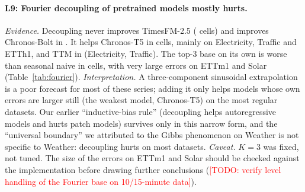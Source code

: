 \documentclass[11pt,a4paper]{article}
\newcommand{\lrn}[1]{\textbf{L#1}}
\newcommand{\todo}[1]{\textcolor{red}{[TODO: #1]}}
\begin{document}
\begin{table}[t]
\centering
\caption{Effect of Fourier decoupling (top-3 rFFT base + model on the remainder) on zero-shot models: relative MSE change in \%, averaged over horizons (negative is better).}
\label{tab:fourier}
\resizebox{\columnwidth}{!}{}
\end{table}

\paragraph{\lrn{9}: Fourier decoupling of pretrained models mostly hurts.}
\emph{Evidence.} Decoupling never improves TimesFM-2.5 (\fdecTimesFMTwoFiveImproved{} cells) and improves Chronos-Bolt in \fdecChronosBoltImproved{}. It helps Chronos-T5 in \fdecChronosTFiveImproved{} cells, mainly on Electricity, Traffic and ETTh1, and TTM in \fdecTTMImproved{} (Electricity, Traffic). The top-3 base on its own is worse than seasonal naive in \fourierBaseWorseThanSnaive{} cells, with very large errors on ETTm1 and Solar (Table~\ref{tab:fourier}).
\emph{Interpretation.} A three-component sinusoidal extrapolation is a poor forecast for most of these series; adding it only helps models whose own errors are larger still (the weakest model, Chronos-T5) on the most regular datasets. Our earlier ``inductive-bias rule'' (decoupling helps autoregressive models and hurts patch models) survives only in this narrow form, and the ``universal boundary'' we attributed to the Gibbs phenomenon on Weather is not specific to Weather: decoupling hurts on most datasets.
\emph{Caveat.} $K{=}3$ was fixed, not tuned. The size of the errors on ETTm1 and Solar should be checked against the implementation before drawing further conclusions (\todo{verify level handling of the Fourier base on 10/15-minute data}).

\begin{table}[t]
\centering
\caption{DSOF-SD spectral distillation with matched controls (test MSE, mean over three seeds). Control: same trainer and schedule with distillation weight zero. Warm: student after 5 epochs. Teacher: zero-shot TimesFM-2.5 on the full test set.}
\label{tab:dsof}
\resizebox{\columnwidth}{!}{}
\end{table}
\end{document}
